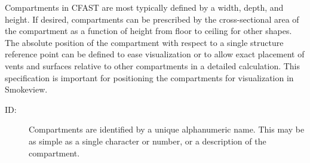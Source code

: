 \label{Compartment_Geometry}Compartments in CFAST are most typically defined by a width, depth, and height.  If desired, compartments can be prescribed by the cross-sectional area of the compartment as a function of height from floor to ceiling for other shapes. The absolute position of the compartment with respect to a single structure reference point can be defined to ease visualization or to allow exact placement of vents and surfaces relative to other compartments in a detailed calculation. This specification is important for positioning the compartments for visualization in Smokeview.

\begin{description}
\item[ ID:] Compartments are identified by a unique alphanumeric name.  This may be as simple as a single character or number, or a description of the compartment.
\end{description}




